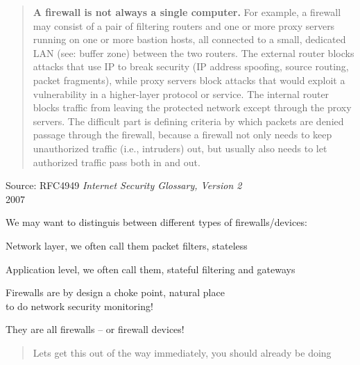 \documentclass[Screen16to9,17pt]{foils}
\begin{document}
\begin{quote}\small
{\bf A firewall is not always a single computer.} For example, a firewall may consist of a pair of filtering routers and one or more proxy servers running on one or more bastion hosts, all connected to a small, dedicated LAN (see: buffer zone) between the two routers. The external router blocks attacks that use IP to break security (IP address spoofing, source routing, packet fragments), while proxy servers block attacks that would exploit a vulnerability in a higher-layer protocol or service. The internal router blocks traffic from leaving the protected network except through the proxy servers. The difficult part is defining criteria by which packets are denied passage through the firewall, because a firewall not only needs to keep unauthorized traffic (i.e., intruders) out, but usually also needs to let authorized traffic pass both in and out.
\end{quote}
{\footnotesize Source: RFC4949 \emph{Internet Security Glossary, Version 2}\\
 2007}


We may want to distinguis between different types of firewalls/devices:
\begin{list2}
\item Network layer, we often call them packet filters, stateless
\item Application level, we often call them, stateful filtering and gateways
\item Firewalls are by design a choke point, natural place \\
to do network security monitoring!
\end{list2}

They are all firewalls -- or firewall devices!


\begin{quote}
Lets get this out of the way immediately, you should already be doing
\end{quote}
\end{document}
